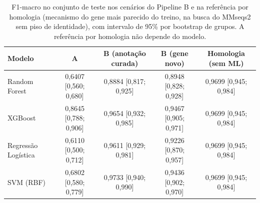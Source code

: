 \begin{table}[htbp]
  \centering
  \caption{F1-macro no conjunto de teste nos cenários do Pipeline B e na referência por homologia (mecanismo do gene mais parecido do treino, na busca do MMseqs2 sem piso de identidade), com intervalo de 95\% por bootstrap de grupos. A referência por homologia não depende do modelo.}
  \label{tab:cenarios}
  \begin{tabular}{lcccc}
    \toprule
    Modelo & A & B (anotação curada) & B (gene novo) & Homologia (sem ML) \\
    \midrule
    Random Forest & 0,6407 [0,560; 0,680] & 0,8884 [0,817; 0,925] & 0,8948 [0,828; 0,928] & 0,9699 [0,945; 0,984] \\
    XGBoost & 0,8645 [0,788; 0,906] & 0,9654 [0,932; 0,985] & 0,9467 [0,905; 0,971] & 0,9699 [0,945; 0,984] \\
    Regressão Logística & 0,6110 [0,500; 0,712] & 0,9611 [0,929; 0,981] & 0,9226 [0,870; 0,957] & 0,9699 [0,945; 0,984] \\
    SVM (RBF) & 0,6802 [0,580; 0,779] & 0,9733 [0,940; 0,990] & 0,9436 [0,902; 0,970] & 0,9699 [0,945; 0,984] \\
    \bottomrule
  \end{tabular}
\end{table}
